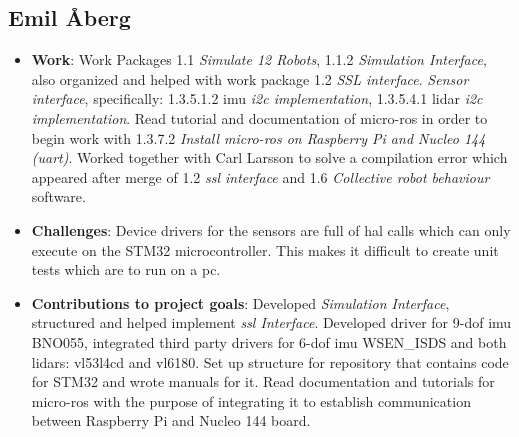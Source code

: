 \subsection*{Emil Åberg}
\begin{itemize}
    \item \textbf{Work}: Work Packages 1.1 \textit{Simulate 12 Robots}, 1.1.2 \textit{Simulation Interface}, also organized and helped with work package 1.2 \textit{SSL interface}. \textit{Sensor interface}, specifically: 1.3.5.1.2 \acs{imu} \textit{\acs{i2c} implementation}, 1.3.5.4.1 \acs{lidar} \textit{\acs{i2c} implementation}. Read tutorial and documentation of \ac{micro-ros} in order to begin work with 1.3.7.2 \textit{Install \acs{micro-ros} on Raspberry Pi and Nucleo 144 (\acs{uart})}. Worked together with Carl Larsson to solve a compilation error which appeared after merge of 1.2 \textit{\acs{ssl} interface} and 1.6 \textit{Collective robot behaviour} software.
    \item \textbf{Challenges}: Device drivers for the sensors are full of \ac{hal} calls which can only execute on the STM32 microcontroller. This makes it difficult to create unit tests which are to run on a \ac{pc}.
    \item \textbf{Contributions to project goals}: Developed \textit{Simulation Interface}, structured and helped implement \textit{\acs{ssl} Interface}. Developed driver for 9-\ac{dof} \ac{imu} BNO055, integrated third party drivers for 6-\ac{dof} \ac{imu} WSEN\_ISDS and both \acp{lidar}: vl53l4cd and vl6180. Set up structure for repository that contains code for STM32 and wrote manuals for it. Read documentation and tutorials for \ac{micro-ros} with the purpose of integrating it to establish communication between Raspberry Pi and Nucleo 144 board.
\end{itemize}



\begin{comment}

\end{comment}

